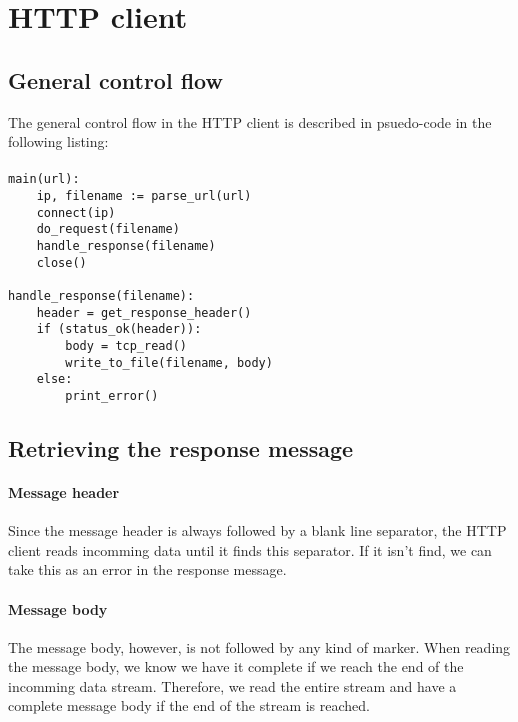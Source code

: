 \documentclass[11pt]{article}
\begin{document}
\section{HTTP client}


\subsection{General control flow}

The general control flow in the HTTP client is described in psuedo-code in the
following listing:

\paragraph{}

\begin{lstlisting}[title=HTTP client control flow]
main(url):
    ip, filename := parse_url(url)
    connect(ip)
    do_request(filename)
    handle_response(filename)
    close()

handle_response(filename):
    header = get_response_header()
    if (status_ok(header)):
        body = tcp_read()
        write_to_file(filename, body)
    else:
        print_error()
\end{lstlisting}


\subsection{Retrieving the response message}

\paragraph{Message header}

Since the message header is always followed by a blank line separator, the
HTTP client reads incomming data until it finds this separator. If it isn't
find, we can take this as an error in the response message.

\paragraph{Message body}

The message body, however, is not followed by any kind of marker. When reading
the message body, we know we have it complete if we reach the end of the
incomming data stream. Therefore, we read the entire stream and have a
complete message body if the end of the stream is reached.
\end{document}
